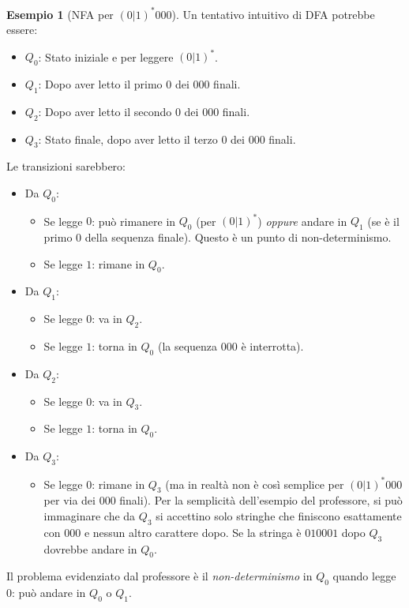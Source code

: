 \documentclass[a4paper]{article}
\theoremstyle{definition} %
\newtheorem{example}{Esempio}[section]
\begin{document}
\begin{example}[NFA per $(0|1)^*000$]
Un tentativo intuitivo di DFA potrebbe essere:
\begin{itemize}
    \item $Q_0$: Stato iniziale e per leggere $(0|1)^*$.
    \item $Q_1$: Dopo aver letto il primo $0$ dei $000$ finali.
    \item $Q_2$: Dopo aver letto il secondo $0$ dei $000$ finali.
    \item $Q_3$: Stato finale, dopo aver letto il terzo $0$ dei $000$ finali.
\end{itemize}
Le transizioni sarebbero:
\begin{itemize}
    \item Da $Q_0$:
        \begin{itemize}
            \item Se legge $0$: può rimanere in $Q_0$ (per $(0|1)^*$) \emph{oppure} andare in $Q_1$ (se è il primo $0$ della sequenza finale). Questo è un punto di non-determinismo.
            \item Se legge $1$: rimane in $Q_0$.
        \end{itemize}
    \item Da $Q_1$:
        \begin{itemize}
            \item Se legge $0$: va in $Q_2$.
            \item Se legge $1$: torna in $Q_0$ (la sequenza $000$ è interrotta).
        \end{itemize}
    \item Da $Q_2$:
        \begin{itemize}
            \item Se legge $0$: va in $Q_3$.
            \item Se legge $1$: torna in $Q_0$.
        \end{itemize}
    \item Da $Q_3$:
        \begin{itemize}
            \item Se legge $0$: rimane in $Q_3$ (ma in realtà non è così semplice per $(0|1)^*000$ per via dei $000$ finali). Per la semplicità dell'esempio del professore, si può immaginare che da $Q_3$ si accettino solo stringhe che finiscono esattamente con $000$ e nessun altro carattere dopo. Se la stringa è $010001$ dopo $Q_3$ dovrebbe andare in $Q_0$.
        \end{itemize}
\end{itemize}
Il problema evidenziato dal professore è il \emph{non-determinismo} in $Q_0$ quando legge $0$: può andare in $Q_0$ o $Q_1$.
\end{example}
\end{document}
